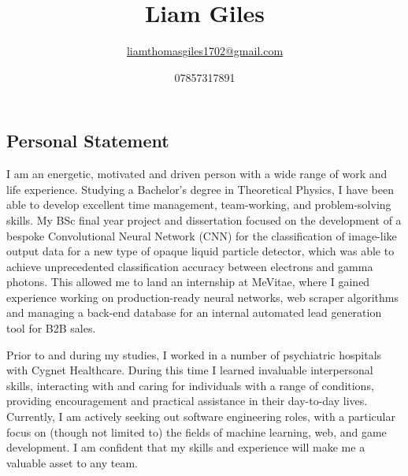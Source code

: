 \documentclass[11pt, a4paper, draft]{article}
\title{Liam Giles}
\author{\url{liamthomasgiles1702@gmail.com}}
\date{07857317891}
\begin{document}
\maketitle
\thispagestyle{empty}

\subsection*{Personal Statement}
I am an energetic, motivated and driven person with a wide range of work and life experience. Studying a Bachelor's degree in Theoretical Physics, I have been able to develop excellent time management, team-working, and problem-solving skills. My BSc final year project and dissertation focused on the development of a bespoke Convolutional Neural Network (CNN) for the classification of image-like output data for a new type of opaque liquid particle detector, which was able to achieve unprecedented classification accuracy between electrons and gamma photons. This allowed me to land an internship at MeVitae, where I gained experience working on production-ready neural networks, web scraper algorithms and managing a back-end database for an internal automated lead generation tool for B2B sales.

Prior to and during my studies, I worked in a number of psychiatric hospitals with Cygnet Healthcare. During this time I learned invaluable interpersonal skills, interacting with and caring for individuals with a range of conditions, providing encouragement and practical assistance in their day-to-day lives. Currently, I am actively seeking out software engineering roles, with a particular focus on (though not limited to) the fields of machine learning, web, and game development. I am confident that my skills and experience will make me a valuable asset to any team.
\end{document}
